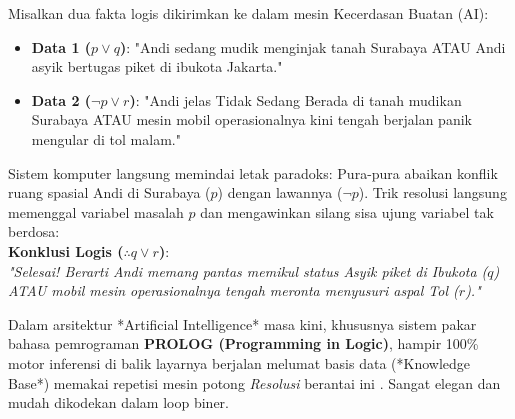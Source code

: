 \begin{contoh}
Misalkan dua fakta logis dikirimkan ke dalam mesin Kecerdasan Buatan (AI):
\begin{itemize}
    \item \textbf{Data 1 ($p \lor q$)}: "Andi sedang mudik menginjak tanah Surabaya ATAU Andi asyik bertugas piket di ibukota Jakarta."
    \item \textbf{Data 2 ($\neg p \lor r$)}: "Andi jelas Tidak Sedang Berada di tanah mudikan Surabaya ATAU mesin mobil operasionalnya kini tengah berjalan panik mengular di tol malam."
\end{itemize}
Sistem komputer langsung memindai letak paradoks: Pura-pura abaikan konflik ruang spasial Andi di Surabaya ($p$) dengan lawannya ($\neg p$). Trik resolusi langsung memenggal variabel masalah $p$ dan mengawinkan silang sisa ujung variabel tak berdosa: \\
\textbf{Konklusi Logis ($\therefore q \lor r$)}: \\ \textit{"Selesai! Berarti Andi memang pantas memikul status Asyik piket di Ibukota ($q$) ATAU mobil mesin operasionalnya tengah meronta menyusuri aspal Tol ($r$)."}
\end{contoh}

Dalam arsitektur *Artificial Intelligence* masa kini, khususnya sistem pakar bahasa pemrograman \textbf{PROLOG (Programming in Logic)}, hampir 100\% motor inferensi di balik layarnya berjalan melumat basis data (*Knowledge Base*) memakai repetisi mesin potong \textit{Resolusi} berantai ini \cite{wiki_first_order_logic}. Sangat elegan dan mudah dikodekan dalam loop biner.
